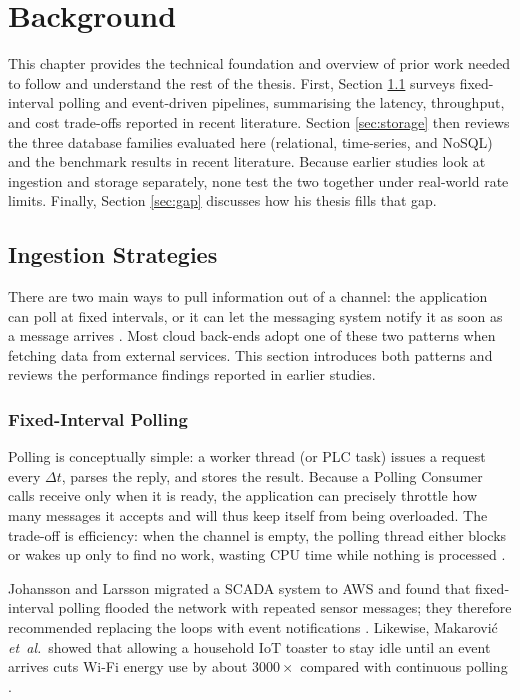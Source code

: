 \documentclass[nomenclature, english, biblatex]{kththesis}
\numberwithin{listing}{chapter}
\begin{document}
\cleardoublepage
\chapter{Background}
\label{ch:background}

This chapter provides the technical foundation and overview of prior work needed to follow and understand the rest of the thesis. First,
Section \ref{sec:ingestion} surveys fixed-interval polling and event-driven pipelines, summarising the latency, throughput, and cost trade-offs reported in recent literature. Section \ref{sec:storage} then reviews the three database families evaluated here (relational, time-series, and NoSQL) and the benchmark results in recent literature. Because earlier studies look at ingestion and storage separately, none test the two together under real-world rate limits. Finally, Section \ref{sec:gap} discusses how his thesis fills that gap.



\section{Ingestion Strategies}
\label{sec:ingestion}
There are two main ways to pull information out of a channel: the application can poll at fixed intervals, or it can let the messaging system notify it as soon as a message arrives \cite[Ch.~10]{Hohpe2003EIP}.
Most cloud back-ends adopt one of these two patterns when fetching data from external services. This section introduces both patterns and reviews the performance findings reported in earlier studies.


\subsection{Fixed-Interval Polling}
Polling is conceptually simple: a worker thread (or PLC task) issues a request every $\Delta t$, parses the reply, and stores the result.
Because a Polling Consumer calls receive only when it is ready, the application can precisely throttle how many messages it accepts and will thus keep itself from being overloaded.
The trade-off is efficiency: when the channel is empty, the polling thread either blocks or wakes up only to find no work, wasting CPU time while nothing is processed \cite[pp.~494–497]{Hohpe2003EIP}.

Johansson and Larsson migrated a \gls{SCADA} system to \gls{AWS} and found that fixed‐interval polling flooded the network with repeated sensor messages; they therefore recommended replacing the loops with event notifications \cite{Johansson2021SCADAIaaS}. 
Likewise, Makarović \textit{et~al.}\ showed that allowing a household \gls{IoT} toaster to stay idle until an event arrives cuts Wi-Fi energy use by about \(3000\times\) compared with continuous polling \cite{Makarovi2022EnergyEfficientIoT}.
\end{document}
